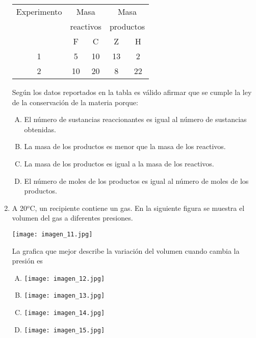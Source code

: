 \begin{enumerate}
\begin{center}
\begin{tabular}{|ccccc|}
\hline 
Experimento & \multicolumn{2}{c}{Masa} & \multicolumn{2}{c|}{Masa}\\
 & \multicolumn{2}{c}{reactivos} & \multicolumn{2}{c|}{productos}\\ 
\hline 
 & F & C & Z & H \\ 

1 & 5 & 10 & 13 & 2 \\ 

2 & 10 & 20 & 8 & 22 \\ 
\hline 
\end{tabular}  

Según los datos reportados en la tabla es válido afirmar que se cumple la ley de la conservación de la materia porque:

\end{center}
\begin{enumerate}[(A)]
\item El número de sustancias reaccionantes es igual al número de sustancias obtenidas.
\item La masa de los productos es menor que la masa de los reactivos. 
\item La masa de los productos es igual a la masa de los reactivos.
\item El número de moles de los productos es igual al número de moles de los productos.
\end{enumerate}

\newpage
\item A 20$^o$C, un recipiente contiene un gas. En la siguiente figura se muestra el volumen del gas a diferentes presiones.\label{mon-18}


\texttt{[image: imagen\_11.jpg]}

La grafica que mejor describe la variación del volumen cuando cambia la presión es



\begin{enumerate}[(A)]
\item \texttt{[image: imagen\_12.jpg]}
\item \texttt{[image: imagen\_13.jpg]}
\item \texttt{[image: imagen\_14.jpg]}
\item \texttt{[image: imagen\_15.jpg]}
\end{enumerate}



\end{enumerate}
